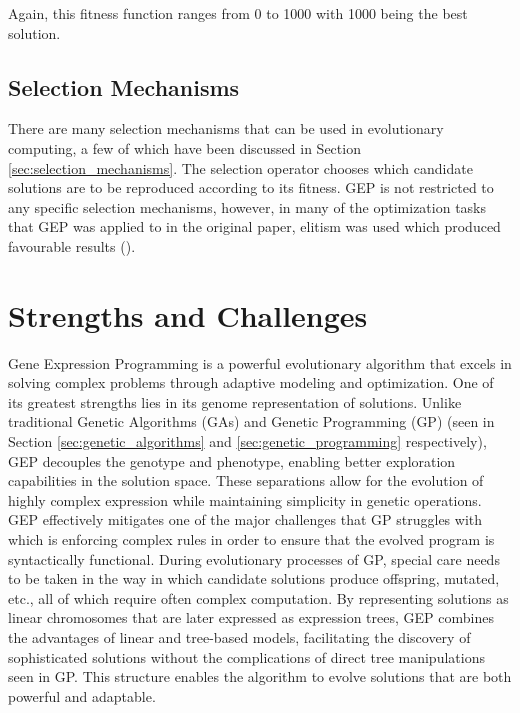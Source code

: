 \begin{enumerate}
    \noindent Again, this fitness function ranges from 0 to 1000 with 1000 being the best solution.
\end{enumerate}

\subsection{Selection Mechanisms}
There are many selection mechanisms that can be used in evolutionary computing, a few of which have been discussed in Section \ref{sec:selection_mechanisms}. The selection operator chooses which candidate solutions are to be reproduced according to its fitness. GEP is not restricted to any specific selection mechanisms, however, in many of the optimization tasks that GEP was applied to in the original paper, elitism was used which produced favourable results (\cite{ferreira2006gene}).

\section{Strengths and Challenges}\label{sec:gep_strenght_challenges}
Gene Expression Programming is a powerful evolutionary algorithm that excels in solving complex problems through adaptive modeling and optimization. One of its greatest strengths lies in its genome representation of solutions. Unlike traditional Genetic Algorithms (GAs) and Genetic Programming (GP) (seen in Section \ref{sec:genetic_algorithms} and \ref{sec:genetic_programming} respectively), GEP decouples the genotype and phenotype, enabling better exploration capabilities in the solution space.  These separations allow for the evolution of highly complex expression while maintaining simplicity in genetic operations. GEP effectively mitigates one of the major challenges that GP struggles with which is enforcing complex rules in order to ensure that the evolved program is syntactically functional. During evolutionary processes of GP, special care needs to be taken in the way in which candidate solutions produce offspring, mutated, etc., all of which require often complex computation. By representing solutions as linear chromosomes that are later expressed as expression trees, GEP combines the advantages of linear and tree-based models, facilitating the discovery of sophisticated solutions without the complications of direct tree manipulations seen in GP. This structure enables the algorithm to evolve solutions that are both powerful and adaptable.

